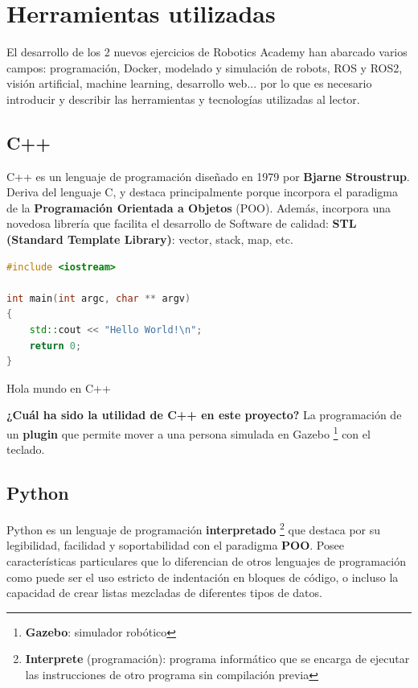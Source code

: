 \chapter{Herramientas utilizadas}
\label{cap:capitulo3}

El desarrollo de los 2 nuevos ejercicios de Robotics Academy han abarcado varios campos: programación, Docker, modelado y simulación de robots, ROS y ROS2, visión artificial, machine learning, desarrollo web... por lo que es necesario introducir y describir las herramientas y tecnologías utilizadas al lector.\\




\section{C++}
\label{sec:c++}

C++ es un lenguaje de programación diseñado en 1979 por \textbf{Bjarne Stroustrup}. Deriva del lenguaje C, y destaca principalmente porque incorpora el paradigma de la \textbf{Programación Orientada a Objetos} (POO). Además, incorpora una novedosa librería que facilita el desarrollo de Software de calidad: \textbf{STL (Standard Template Library)}: vector, stack, map, etc. \cite{history_c++}\\

\begin{code}[H]
\begin{lstlisting}[language=C++]
#include <iostream>

int main(int argc, char ** argv)
{
	std::cout << "Hello World!\n";
	return 0;
}
\end{lstlisting}
\caption[Hola mundo en C++]{Hola mundo en C++}
\label{cod:holamundo_cplusplus}
\end{code}

\textbf{¿Cuál ha sido la utilidad de C++ en este proyecto?} La programación de un \textbf{plugin} que permite mover a una persona simulada en Gazebo \footnote{\textbf{Gazebo}: simulador robótico} con el teclado.\\




\section{Python}
\label{sec:python}

Python es un lenguaje de programación \textbf{interpretado} \footnote{\textbf{Interprete} (programación): programa informático que se encarga de ejecutar las instrucciones de otro programa sin compilación previa} que destaca por su legibilidad, facilidad y soportabilidad con el paradigma \textbf{POO}. Posee características particulares que lo diferencian de otros lenguajes de programación como puede ser el uso estricto de indentación en bloques de código, o incluso la capacidad de crear listas mezcladas de diferentes tipos de datos.\\

